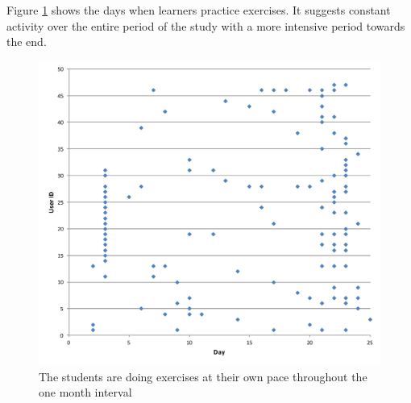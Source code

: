 Figure \ref{fig:activity_per_day} shows the days when learners practice exercises. It suggests constant activity over the entire period of the study with a more intensive period towards the end.

  \begin{figure}[h!]
  \centering
    \includegraphics[width=0.8\columnwidth]{figures/user_exercise_activity_vs_day.pdf}
    \caption{The students are doing exercises at their own pace throughout the one month interval }
    \label{fig:activity_per_day}
  \end{figure}


